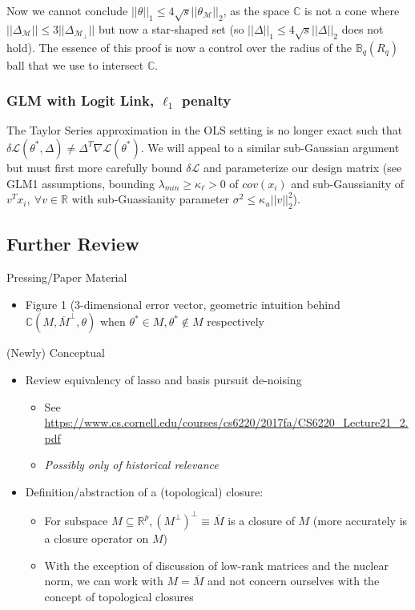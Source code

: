 \documentclass[11pt]{article}
\begin{document}
Now we cannot conclude $||\theta||_1 \leq 4\sqrt{s}||\theta_\mathcal{M}||_2$, as the space $\mathbb{C}$ is not a cone where $||\Delta_\mathcal{M}|| \leq 3||\Delta_{\mathcal{M}_\perp}||$ but now a star-shaped set (so $||\Delta||_1 \leq 4\sqrt{s}||\Delta||_2$ does not hold).  The essence of this proof is now a control over the radius of the $\mathbb{B}_q(R_q)$ ball that we use to intersect $\mathbb{C}$. 
\newline 


\subsubsection{GLM with Logit Link, $\ell_1$ penalty}

The Taylor Series approximation in the OLS setting is no longer exact such that $\delta\mathcal{L}(\theta^*, \Delta) \neq \Delta^T \nabla \mathcal{L}(\theta^*)$. We will appeal to a similar sub-Gaussian argument but must first more carefully bound $\delta\mathcal{L}$ and parameterize our design matrix (see GLM1 assumptions, bounding $\lambda_{min}\geq \kappa_\ell > 0$ of $cov(x_i)$ and sub-Gaussianity of $v^T x_i, \ \forall v \in \mathbb{R}$ with sub-Guassianity parameter $\sigma^2\leq \kappa_u ||v||_2^2$). 

\newpage  
\subsection*{Further Review}

Pressing/Paper Material 
\begin{itemize}	
    \item Figure 1 (3-dimensional error vector, geometric intuition behind $\mathbb{C}(M, \overline{M}^\perp, \theta)$ when $\theta^* \in M, \theta^*\not\in M$ respectively 
\end{itemize}

(Newly) Conceptual
\begin{itemize}
    \item Review equivalency of lasso and basis pursuit de-noising
    \begin{itemize}
        \item See \url{https://www.cs.cornell.edu/courses/cs6220/2017fa/CS6220_Lecture21_2.pdf}
        \item {\it Possibly only of historical relevance}
    \end{itemize}
    \item Definition/abstraction of a (topological) closure:
    \begin{itemize}
        \item For subspace $M \subseteq \mathbb{R}^p, \left(M^\perp \right)^\perp \equiv \overline{M}$ is a closure of $M$ (more accurately is a closure operator on $M$) 
        \item With the exception of discussion of low-rank matrices and the nuclear norm, we can work with $M = \overline{M}$ and not concern ourselves with the concept of topological closures 
    \end{itemize}
\end{itemize}
\end{document}
